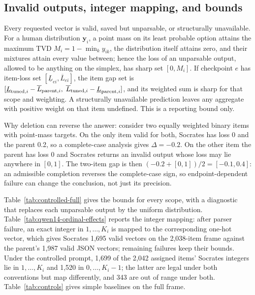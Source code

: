\documentclass[11pt]{article}
\begin{document}
\subsection{Invalid outputs, integer mapping, and bounds}
\label{app:controls}

Every requested vector is valid, saved but unparsable, or structurally
unavailable. For a human distribution $\mathbf y_i$, a point mass on its least
probable option attains the maximum TVD $M_i=1-\min_k y_{ik}$, the distribution
itself attains zero, and their mixtures attain every value between; hence the
loss of an unparsable output, allowed to be anything on the simplex, has sharp
set $[0,M_i]$. If checkpoint $e$ has item-loss set
$[\underline L_{ei},\overline L_{ei}]$, the item gap set is
$[\underline L_{{\rm tuned},i}-\overline L_{{\rm parent},i},\;
\overline L_{{\rm tuned},i}-\underline L_{{\rm parent},i}]$, and its weighted
sum is sharp for that scope and weighting. A structurally unavailable
prediction leaves any aggregate with positive weight on that item undefined.
This is a reporting bound only.

Why deletion can reverse the answer: consider two equally weighted binary items
with point-mass targets. On the only item valid for both, Socrates has loss 0
and the parent 0.2, so a complete-case analysis gives $\Delta=-0.2$. On the
other item the parent has loss 0 and Socrates returns an invalid output whose
loss may lie anywhere in $[0,1]$. The two-item gap is then
$(-0.2+[0,1])/2=[-0.1,0.4]$: an admissible completion reverses the
complete-case sign, so endpoint-dependent failure can change the conclusion,
not just its precision.

Table~\ref{tab:controlled-full} gives the bounds for every scope, with a
diagnostic that replaces each unparsable output by the uniform distribution.
Table~\ref{tab:qwen14-ordinal-effects} reports the integer mapping: after
parser failure, an exact integer in $1,\ldots,K_i$ is mapped to the
corresponding one-hot vector, which gives Socrates 1,695 valid vectors on the
2,038-item frame against the parent's 1,987 valid JSON vectors; remaining
failures keep their bounds. Under the controlled prompt, 1,699 of the 2,042
assigned items' Socrates integers lie in $1,\ldots,K_i$ and 1,520 in $0,\ldots,K_i-1$; the
latter are legal under both conventions but map differently, and 343 are out
of range under both. Table~\ref{tab:controls} gives simple baselines on the
full frame.
\end{document}
